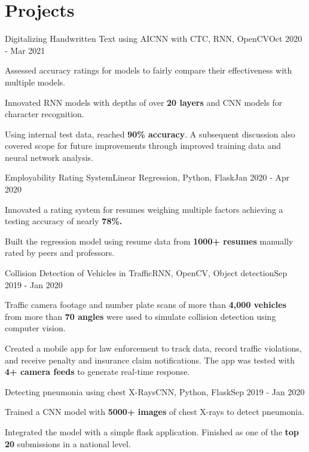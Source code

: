 \documentclass[letterpaper]{resume_config}
\begin{document}
\section{Projects}
\Project
    {Digitalizing Handwritten Text using AI}{CNN with CTC, RNN, OpenCV}{Oct 2020 - Mar 2021}
    {
        \item {Assessed accuracy ratings for models to fairly compare their effectiveness with multiple models.} 
        \item {Innovated RNN models with depths of over \textbf{20 layers} and CNN models for character recognition.}
        \item {Using internal test data, reached \textbf{90\% accuracy}. A subsequent discussion also covered scope for future improvements through improved training data and neural network analysis.}
    }
\Project
    {Employability Rating System}{Linear Regression, Python, Flask}{Jan 2020 - Apr 2020}
    {
        \item {Innovated a rating system for resumes weighing multiple factors achieving a testing accuracy of nearly \textbf{78\%.}}
        \item {Built the regression model using resume data from \textbf{1000+ resumes} manually rated by peers and professors.}
    }
\Project
    {Collision Detection of Vehicles in Traffic}{RNN, OpenCV, Object detection}{Sep 2019 - Jan 2020}
    {
        \item {Traffic camera footage and number plate scans of more than \textbf{4,000 vehicles} from more than \textbf{70 angles} were used to simulate collision detection using computer vision.}
        \item {Created a mobile app for law enforcement to track data, record traffic violations, and receive penalty and insurance claim notifications. The app was tested with \textbf{4+ camera feeds} to generate real-time response.}
    }
\Project
    {Detecting pneumonia using chest X-Rays}{CNN, Python, Flask}{Sep 2019 - Jan 2020}
    {
        \item{Trained a CNN model with \textbf{5000+ images} of chest X-rays to detect pneumonia.}
        \item{Integrated the model with a simple flask application. Finished as one of the \textbf{top 20} submissions in a national level.}
    }
\vspace{-5pt}
\end{document}
